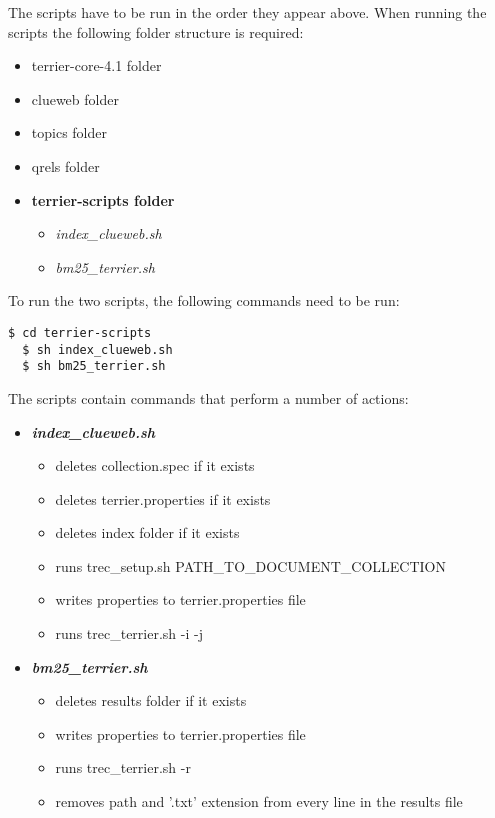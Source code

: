 \documentclass{article} %
\begin{document}
The scripts have to be run in the order they appear above. When running the scripts the following folder structure is required:

\begin{itemize}
    \item terrier-core-4.1 folder
    \item clueweb folder
    \item topics folder
    \item qrels folder
    \item \textbf{terrier-scripts folder}
    \begin{itemize}
        \item \textit{index\_clueweb.sh}
        \item \textit{bm25\_terrier.sh}
    \end{itemize}
\end{itemize}

To run the two scripts, the following commands need to be run:

\begin{lstlisting}[style=Bash]
  $ cd terrier-scripts
  $ sh index_clueweb.sh
  $ sh bm25_terrier.sh
\end{lstlisting}

The scripts contain commands that perform a number of actions:
\begin{itemize}
    \item \textit{\textbf{index\_clueweb.sh}}
    \begin{itemize}
        \item deletes collection.spec if it exists
        \item deletes terrier.properties if it exists
        \item deletes index folder if it exists
        \item runs trec\_setup.sh PATH\_TO\_DOCUMENT\_COLLECTION
        \item writes properties to terrier.properties file
        \item runs trec\_terrier.sh -i -j
    \end{itemize}
    \item \textit{\textbf{bm25\_terrier.sh}}
    \begin{itemize}
        \item deletes results folder if it exists
        \item writes properties to terrier.properties file
        \item runs trec\_terrier.sh -r
        \item removes path and '.txt' extension from every line in the results file
    \end{itemize}
\end{itemize}
\end{document}

